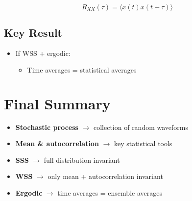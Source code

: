 \documentclass[12pt]{article}
\begin{document}
\[
R_{XX}(\tau) = \langle x(t)x(t+\tau)\rangle
\]

\subsection*{Key Result}

\begin{itemize}
\item If WSS + ergodic:
\begin{itemize}
\item Time averages = statistical averages
\end{itemize}
\end{itemize}

\section*{Final Summary}

\begin{itemize}
\item \textbf{Stochastic process} $\rightarrow$ collection of random waveforms
\item \textbf{Mean \& autocorrelation} $\rightarrow$ key statistical tools
\item \textbf{SSS} $\rightarrow$ full distribution invariant
\item \textbf{WSS} $\rightarrow$ only mean + autocorrelation invariant
\item \textbf{Ergodic} $\rightarrow$ time averages = ensemble averages
\end{itemize}
\end{document}
